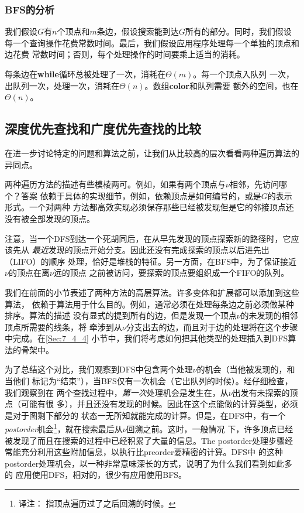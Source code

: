 \subsubsection{BFS的分析}
我们假设$G$有$n$个顶点和$m$条边，假设搜索能到达$G$所有的部分。同时，我们假设
每一个查询操作花费常数时间。最后，我们假设应用程序处理每一个单独的顶点和边花费
常数时间；否则，每个处理操作的时间要乘上适当的消耗。

每条边在{\textbf{while}}循环总被处理了一次，消耗在$\Theta(m)$。每一个顶点入队列
一次，出队列一次，处理一次，消耗在$\Theta(n)$。数组{\textbf{color}}和队列需要
额外的空间，也在$\Theta(n)$。


\subsection{深度优先查找和广度优先查找的比较}
在进一步讨论特定的问题和算法之前，让我们从比较高的层次看看两种遍历算法的异同点。

两种遍历方法的描述有些模棱两可。例如，如果有两个顶点与$\nu$相邻，先访问哪个？答案
依赖于具体的实现细节，例如，依赖顶点是如何编号的，或是$G$的表示形式。一个对两种
方法都高效实现必须保存那些已经被发现但是它的邻接顶点还没有被全部发现的顶点。

注意，当一个DFS到达一个死胡同后，在从早先发现的顶点探索新的路径时，它应该先从
\emph{最近}发现的顶点开始分支。因此还没有完成探索的顶点以后进先出（LIFO）的顺序
处理，恰好是堆栈的特征。另一方面，在BFS中，为了保证接近$\nu$的顶点在离$\nu$远的顶点
之前被访问，要探索的顶点要组织成一个FIFO的队列。

我们在前面的小节表述了两种方法的高层算法。许多变体和扩展都可以添加到这些算法，
依赖于算法用于什么目的。例如，通常必须在处理每条边之前必须做某种排序。算法的描述
没有显式的提到所有的边，但是发现一个顶点$\nu$的未发现的相邻顶点所需要的线条，将
牵涉到从$\nu$分支出去的边，而且对于边的处理将在这个步骤中完成。在\ref{Sec:7_4_4}
小节中，我们将考虑如何把其他类型的处理插入到DFS算法的骨架中。

为了总结这个对比，我们观察到DFS中包含两个处理$\nu$的机会（当他被发现的，和当他们
标记为“结束”），当BFS仅有一次机会（它出队列的时候）。经仔细检查，我们观察到在
两个查找过程中，\emph{第一次}处理机会是发生在，从$\nu$出发有未探索的顶点（可能有很
多），并且还没有发现的时候。因此在这个点能做的计算类型，必须是对于图剩下部分的
状态一无所知就能完成的计算。但是，在DFS中，有一个\emph{postorder}机会\footnote{译注：
指顶点遍历过了之后回溯的时候。}，就在搜索最后从$\nu$回溯之前。这时，一般情况
下，许多顶点已经被发现了而且在搜索的过程中已经积累了大量的信息。The
postorder处理步骤经常能充分利用这些附加信息，以执行比preorder要精密的计算。DFS中
的这种postorder处理机会，以一种非常意味深长的方式，说明了为什么我们看到如此多的
应用使用DFS，相对的，很少有应用使用BFS。


